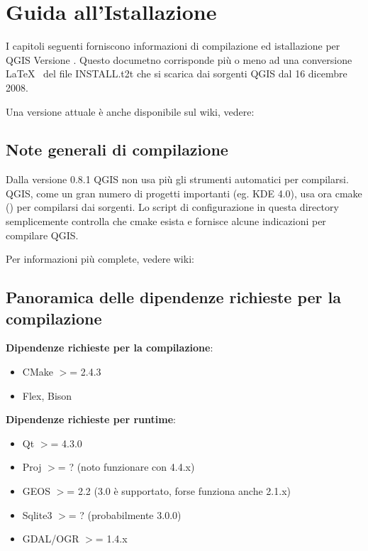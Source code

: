 
\section{Guida all'Istallazione}\label{label_install}


I capitoli seguenti forniscono informazioni di compilazione ed istallazione per QGIS
Versione \CURRENT. Questo documetno corrisponde più o meno ad una conversione \LaTeX~ del file INSTALL.t2t che si scarica dai sorgenti QGIS dal 16 dicembre 2008.

Una versione attuale è anche disponibile sul wiki, vedere:

\subsection{Note generali di compilazione}
Dalla versione 0.8.1 QGIS non usa più gli strumenti automatici per compilarsi. QGIS, come un gran numero di progetti importanti (eg. KDE 4.0), usa ora cmake () per compilarsi dai sorgenti. Lo script di configurazione in questa directory semplicemente controlla che cmake esista e fornisce alcune indicazioni per compilare QGIS.

Per informazioni più complete, vedere wiki:

\subsection{Panoramica delle dipendenze richieste per la compilazione}

\textbf{Dipendenze richieste per la compilazione}:

\begin{itemize}
\item CMake $>$= 2.4.3
\item Flex, Bison
\end{itemize}

\textbf{Dipendenze richieste per runtime}:

\begin{itemize}
\item Qt $>$= 4.3.0
\item Proj $>$= ? (noto funzionare con 4.4.x)
\item GEOS $>$= 2.2 (3.0 è supportato, forse funziona anche 2.1.x)
\item Sqlite3 $>$= ? (probabilmente 3.0.0)
\item GDAL/OGR $>$= 1.4.x
\end{itemize}

